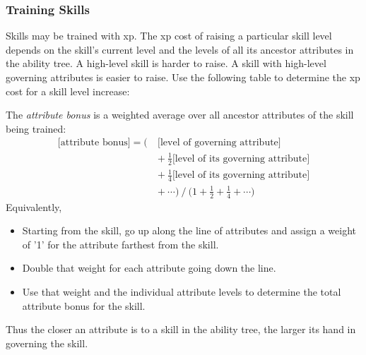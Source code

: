 \documentclass[12pt]{article}
\begin{document}
\subsubsection{Training Skills}\label{sec:skill}
Skills may be trained with xp.
The xp cost of raising a particular skill level depends on
the skill's current level and the levels of all its ancestor attributes in the ability tree.
A high-level skill is harder to raise.
A skill with high-level governing attributes is easier to raise.
Use the following table to determine the xp cost for a skill level increase:

\begin{center}
\resizebox{\columnwidth}{!}{

}
\end{center}


The \emph{attribute bonus} is a weighted average over all ancestor attributes of the skill being trained:
\begin{align*}
\textrm{[attribute bonus]}
=\big(\ &\textrm{[level of governing attribute]}\\
&+\ \frac{1}{2}\textrm{[level of its governing attribute]}\\
&+\ \frac{1}{4}\textrm{[level of its governing attribute]}\\
&+\ \cdots \big)
\ /\ \big(1+\frac{1}{2}+\frac{1}{4}+\cdots\big)
\end{align*}
Equivalently,
\vspace{-6mm}
\begin{itemize}
\item Starting from the skill, go up along the line of attributes
and assign a weight of '1' for the attribute farthest from the skill.
\item Double that weight for each attribute going down the line.
\item Use that weight and the individual attribute levels to determine the total attribute bonus for the skill.
\end{itemize}
\vspace{-6mm}
Thus the closer an attribute is to a skill in the ability tree, the larger its hand in governing the skill. 
\end{document}
